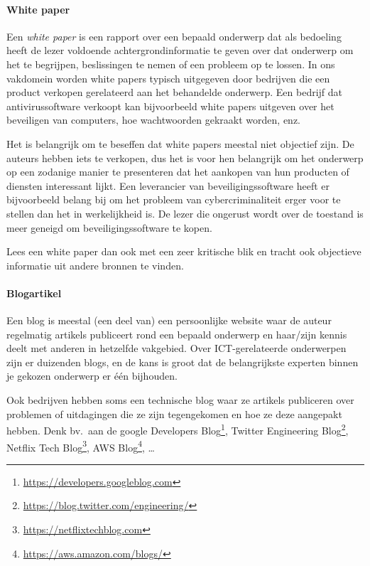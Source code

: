\paragraph{White paper}

Een \emph{white paper} is een rapport over een bepaald onderwerp dat als bedoeling heeft de lezer voldoende achtergrondinformatie te geven over dat onderwerp om het te begrijpen, beslissingen te nemen of een probleem op te lossen. In ons vakdomein worden white papers typisch uitgegeven door bedrijven die een product verkopen gerelateerd aan het behandelde onderwerp. Een bedrijf dat antivirussoftware verkoopt kan bijvoorbeeld white papers uitgeven over het beveiligen van computers, hoe wachtwoorden gekraakt worden, enz.

Het is belangrijk om te beseffen dat white papers meestal niet objectief zijn. De auteurs hebben iets te verkopen, dus het is voor hen belangrijk om het onderwerp op een zodanige manier te presenteren dat het aankopen van hun producten of diensten interessant lijkt. Een leverancier van beveiligingssoftware heeft er bijvoorbeeld belang bij om het probleem van cybercriminaliteit erger voor te stellen dan het in werkelijkheid is. De lezer die ongerust wordt over de toestand is meer geneigd om beveiligingssoftware te kopen.

Lees een white paper dan ook met een zeer kritische blik en tracht ook objectieve informatie uit andere bronnen te vinden.

\paragraph{Blogartikel}

Een blog is meestal (een deel van) een persoonlijke website waar de auteur regelmatig artikels publiceert rond een bepaald onderwerp en haar/zijn kennis deelt met anderen in hetzelfde vakgebied. Over ICT-gerelateerde onderwerpen zijn er duizenden blogs, en de kans is groot dat de belangrijkste experten binnen je gekozen onderwerp er één bijhouden.

Ook bedrijven hebben soms een technische blog waar ze artikels publiceren over problemen of uitdagingen die ze zijn tegengekomen en hoe ze deze aangepakt hebben. Denk bv.\ aan de google Developers Blog\footnote{\url{https://developers.googleblog.com}}, Twitter Engineering Blog\footnote{\url{https://blog.twitter.com/engineering/}}, Netflix Tech Blog\footnote{\url{https://netflixtechblog.com}}, AWS Blog\footnote{\url{https://aws.amazon.com/blogs/}}, \dots

